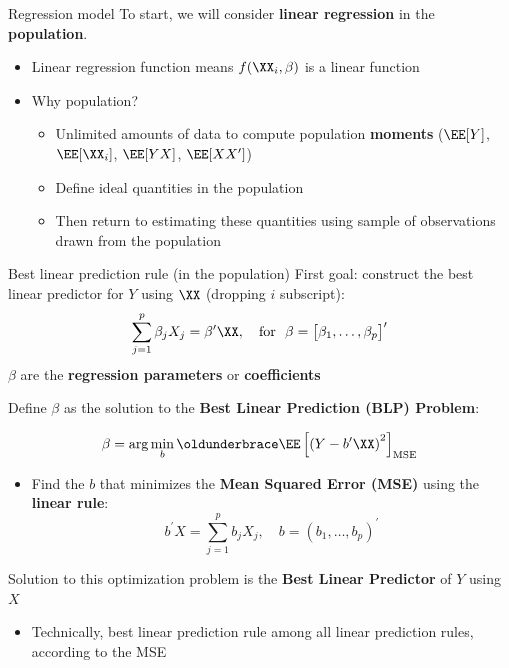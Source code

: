 \documentclass[compress, 8pt]{beamer}
\begin{document}
\begin{frame}{Regression model}
\pause
\vspace{2ex}
To start, we will consider \textbf{linear regression} in the \textbf{population}. 
\begin{itemize}
    \item Linear regression function means $f(\XX_i, \beta)$ is a linear function 
    \item Why population?
    \begin{itemize}
    \item Unlimited amounts of data to compute population \textbf{moments} ($\EE[Y]$, $\EE[\XX_i]$, $\EE [YX]$, $\EE [XX^\prime]$)
    \item Define ideal quantities in the population
    \item Then return to estimating these quantities using sample of observations drawn from the population
    \end{itemize}

\end{itemize}


\end{frame}


\begin{frame}{Best linear prediction rule (in the population)}
    First goal: construct the best linear predictor for $Y$ using $\XX$ (dropping $i$ subscript):
    \begin{equation*}
        \sum_{j=1}^p \beta_j X_j = \beta^\prime \XX, \quad\text{for } \ \beta = \begin{bmatrix}
        \beta_1, \dots, \beta_p
        \end{bmatrix}^\prime
    \end{equation*}
    $\beta$ are the \textbf{regression parameters} or \textbf{coefficients}

    \vspace{2ex}
    Define $\beta$ as the solution to the \textbf{Best Linear Prediction (BLP) Problem}:

    \begin{equation*}
        \beta = \arg \min_{b} \underbrace{\EE \left[ \left(Y - b^\prime \XX \right)^2 \right]}_{\text{MSE}}
    \end{equation*}
\begin{itemize}
    \item Find the $b$ that minimizes the \textbf{Mean Squared Error (MSE)} using the \textbf{linear rule}:
    \begin{equation*}
        b^\prime X = \sum_{j=1}^p b_j X_j, \quad b = (b_1, \dots, b_p)^\prime
    \end{equation*}
\end{itemize}
Solution to this optimization problem is the \textbf{Best Linear Predictor} of $Y$ using $X$ 
\begin{itemize}
    \item Technically, best linear prediction rule among all linear prediction rules, according to the MSE
\end{itemize}


\end{frame}
\end{document}
